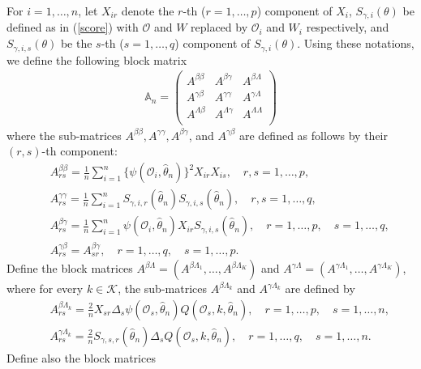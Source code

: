 \documentclass{statsoc}
\begin{document}
For $i=1,\ldots,n$, let $X_{ir}$ denote the $r$-th ($r=1,\ldots,p$) component of $X_i$, $S_{\gamma,i}(\theta)$ be defined as in (\ref{score}) with $\mathcal O$ and $W$ replaced by $\mathcal O_i$ and $W_i$ respectively, and $S_{\gamma,i,s}(\theta)$ be the $s$-th ($s=1,\ldots,q$) component of $S_{\gamma,i}(\theta)$. Using these notations, we define the following block matrix
\begin{eqnarray}\label{bm}
\mathbb A_n=\left(
\begin{array}{ccc}
A^{\beta\beta}& A^{\beta\gamma}& A^{\beta\Lambda}\\
A^{\gamma\beta}& A^{\gamma\gamma}& A^{\gamma\Lambda}\\
A^{\Lambda\beta}& A^{\Lambda\gamma}& A^{\Lambda\Lambda}\\
\end{array}
\right)
\end{eqnarray}
where the sub-matrices $A^{\beta\beta}, A^{\gamma\gamma}, A^{\beta\gamma}$, and $A^{\gamma\beta}$ are defined as follows by their $(r,s)$-th component:
\begin{eqnarray*}
&&A^{\beta\beta}_{rs}=\frac{1}{n}\sum_{i=1}^n\{\psi(\mathcal O_i,\widehat\theta_n)\}^2X_{ir}X_{is}, \quad r,s=1,\ldots,p,\\
&&A^{\gamma\gamma}_{rs}=\frac{1}{n}\sum_{i=1}^nS_{\gamma,i,r}(\widehat\theta_n)S_{\gamma,i,s}(\widehat\theta_n), \quad r,s=1,\ldots,q,\\
&&A^{\beta\gamma}_{rs}=\frac{1}{n}\sum_{i=1}^n\psi(\mathcal O_i,\widehat\theta_n) X_{ir} S_{\gamma,i,s}(\widehat\theta_n), \quad r=1,\ldots,p, \quad s=1,\ldots,q,
\\
&&A^{\gamma\beta}_{rs}=A^{\beta\gamma}_{sr}, \quad r=1,\ldots,q, \quad s=1,\ldots,p.
\end{eqnarray*}
Define the block matrices $A^{\beta\Lambda}=(A^{\beta\Lambda_1},\ldots,A^{\beta\Lambda_K})$ and $A^{\gamma\Lambda}=(A^{\gamma\Lambda_1},\ldots,A^{\gamma\Lambda_K})$, where for every $k\in\mathcal K$, the sub-matrices $A^{\beta\Lambda_k}$ and $A^{\gamma\Lambda_k}$ are defined by
\begin{eqnarray*}
&&A^{\beta\Lambda_k}_{rs}=\frac{2}{n}X_{sr}\Delta_s\psi(\mathcal O_s,\widehat\theta_n)Q(\mathcal O_s,k,\widehat\theta_n), \quad r=1,\ldots,p, \quad s=1,\ldots,n,\\
&&A^{\gamma\Lambda_k}_{rs}=\frac{2}{n}S_{\gamma,s,r}(\widehat\theta_n)\Delta_sQ(\mathcal O_s,k,\widehat\theta_n), \quad r=1,\ldots,q, \quad s=1,\ldots,n.
\end{eqnarray*}
Define also the block matrices
\end{document}

